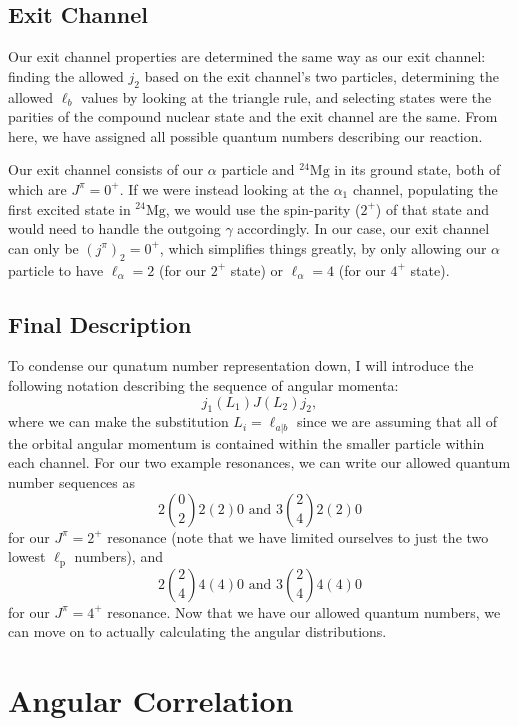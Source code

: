 \documentclass[10pt]{amsart}
\numberwithin{equation}{subsection}
\newcommand{\nuc}[2]{${}^{#1}\textrm{#2}$}
\begin{document}
\subsection{Exit Channel}

Our exit channel properties are determined the same way as our exit channel:
finding the allowed $j_2$ based on the exit channel's two particles,
determining the allowed $\ell_b$ values by looking at the triangle rule, and
selecting states were the parities of the compound nuclear state and the exit
channel are the same. From here, we have assigned all possible quantum numbers
describing our reaction.

Our exit channel consists of our $\alpha$ particle and \nuc{24}{Mg} in its
ground state, both of which are $J^{\pi} = 0^+$. If we were instead looking at
the $\alpha_1$ channel, populating the first excited state in \nuc{24}{Mg}, we
would use the spin-parity ($2^+$) of that state and would need to handle the
outgoing $\gamma$ accordingly. In our case, our exit channel can only be
$(j^{\pi})_2 = 0^+$, which simplifies things greatly, by only allowing our
$\alpha$ particle to have $\ell_{\alpha} = 2$ (for our $2^+$ state) or
$\ell_{\alpha} = 4$ (for our $4^+$ state).


\subsection{Final Description}

To condense our qunatum number representation down, I will introduce the
following notation describing the sequence of angular momenta:
\[
    j_1(L_1)J(L_2)j_2,
\]
where we can make the substitution $L_i = \ell_{a|b}$ since we are assuming that
all of the orbital angular momentum is contained within the smaller particle
within each channel. For our two example resonances, we can write our allowed
quantum number sequences as
\[
    2\binom{0}{2}2(2)0\textrm{ and }3\binom{2}{4}2(2)0
\]
for our $J^{\pi} = 2^+$ resonance (note that we have limited ourselves to just
the two lowest $\ell_{\textrm{p}}$ numbers), and
\[
    2\binom{2}{4}4(4)0\textrm{ and }3\binom{2}{4}4(4)0
\]
for our $J^{\pi} = 4^+$ resonance. Now that we have our allowed quantum
numbers, we can move on to actually calculating the angular distributions.


\section{Angular Correlation}
\end{document}

